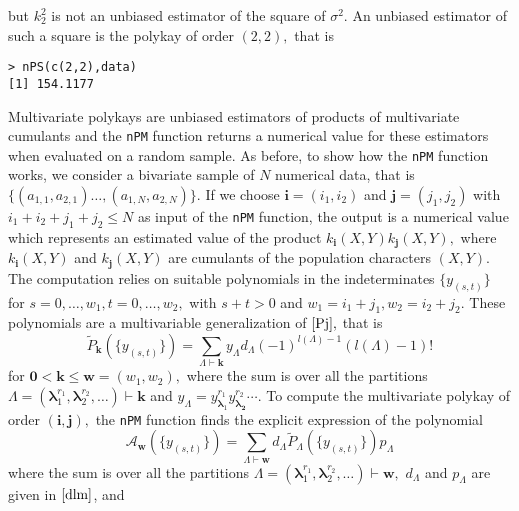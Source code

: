 \hskip-0.5cm but \(k_2^2\) is not an unbiased estimator of the square of \(\sigma^2.\) An unbiased estimator of such a square is the polykay of order \((2,2),\) that is

\begin{verbatim}
> nPS(c(2,2),data)
[1] 154.1177
\end{verbatim}

Multivariate polykays are unbiased estimators of products of multivariate cumulants and the \texttt{nPM} function returns a numerical value for these estimators when evaluated on a random sample. As before, to show how the \texttt{nPM} function works, we consider a bivariate sample of \(N\) numerical data, that is \(\{(a_{1,1},a_{2,1}) \ldots, (a_{1,N},a_{2,N})\}.\) If we choose \(\boldsymbol{i}=(i_1, i_2)\) and \(\boldsymbol{j}=(j_1, j_2)\) with \(i_1 + i_2 + j_1 + j_2 \leq N\) as input of the \texttt{nPM} function, the output is a numerical value which represents an estimated value of the product \(k_{\boldsymbol{i}}(X,Y) k_{\boldsymbol{j}}(X,Y),\) where \(k_{\boldsymbol{i}}(X,Y)\) and \(k_{\boldsymbol{j}}(X,Y)\) are cumulants of the population characters \((X,Y).\) The computation relies on suitable polynomials in the indeterminates \(\{y_{(s,t)}\}\) for \(s=0,\ldots, w_1, t=0,\ldots, w_2,\) with \(s+t>0\) and \(w_1=i_1+j_1, w_2=i_2+j_2.\)
These polynomials are a multivariable generalization of \(\eqref{Pj},\) that is
\begin{equation}\label{Pjm}
\tilde{P}_{\boldsymbol{k}}\left( \{y_{(s,t)}\} \right)  =  \sum_{\Lambda \vdash \boldsymbol{k}} 
y_{\Lambda} d_{\Lambda} (-1)^{l(\Lambda)-1} (l(\Lambda)-1)!
\end{equation}
for \(\boldsymbol{0} < \boldsymbol{k} \leq \boldsymbol{w}=(w_1,w_2),\) where the sum is over all the partitions \(\Lambda=(\boldsymbol{\lambda}_1^{r_1}, \boldsymbol{\lambda}_2^{r_2},\ldots) \vdash \boldsymbol{k}\) and \(y_{\Lambda} = y_{\boldsymbol{\lambda}_1}^{r_1} y_{\boldsymbol{\lambda_2}}^{r_2} \cdots.\) To compute the multivariate polykay of order \((\boldsymbol{i}, \boldsymbol{j}),\) the \texttt{nPM} function finds the explicit expression of the polynomial
\begin{equation}\label{Ai}
{\mathcal A}_{\boldsymbol{w}} \left( \{y_{(s,t)}\} \right) =  \sum_{\Lambda \vdash \boldsymbol{w}} d_{\Lambda}  \tilde{P}_{\Lambda}\left( \{y_{(s,t)}\} \right) p_{\Lambda} 
\end{equation}
where the sum is over all the partitions \(\Lambda=(\boldsymbol{\lambda}_1^{r_1}, \boldsymbol{\lambda}_2^{r_2},\ldots) \vdash \boldsymbol{w},\) \(d_{\Lambda}\) and \(p_{\Lambda}\) are given in \(\eqref{dlm}\), and

